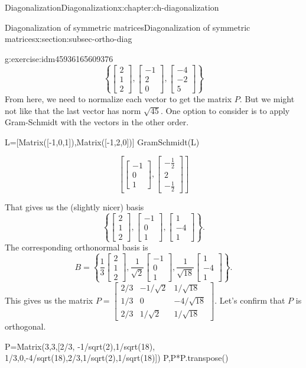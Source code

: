 \documentclass[oneside,10pt,]{book}
\numberwithin{equation}{section}
\newcommand{\bbm}{\begin{bmatrix}}
\newcommand{\ebm}{\end{bmatrix}}
\newcommand{\amp}{&}
\begin{document}
\begin{chapterptx}{Diagonalization}{}{Diagonalization}{}{}{x:chapter:ch-diagonalization}
\begin{sectionptx}{Diagonalization of symmetric matrices}{}{Diagonalization of symmetric matrices}{}{}{x:section:subsec-ortho-diag}
\begin{inlineexercise}{}{g:exercise:idm45936165609376}
\begin{equation*}
\left\{\bbm 2\\1\\2\ebm, \bbm -1\\2\\0\ebm, \bbm -4\\-2\\5\ebm\right\}
\end{equation*}
From here, we need to normalize each vector to get the matrix \(P\). But we might not like that the last vector has norm \(\sqrt{45}\). One option to consider is to apply Gram-Schmidt with the vectors in the other order.%
\begin{sageinput}
L=[Matrix([-1,0,1]),Matrix([-1,2,0])]
GramSchmidt(L)
\end{sageinput}
\begin{sageoutput}
\[\left[\bbm -1\\0\\1\ebm, \bbm -\frac12\\2\\-\frac12\ebm\right]\]
\end{sageoutput}
That gives us the (slightly nicer) basis%
\begin{equation*}
\left\{\bbm 2\\1\\2\ebm, \bbm -1\\0\\1\ebm, \bbm 1\\-4\\1\ebm\right\}\text{.}
\end{equation*}
The corresponding orthonormal basis is%
\begin{equation*}
B = \left\{\frac{1}{3}\bbm 2\\1\\2\ebm, \frac{1}{\sqrt{2}}\bbm -1\\0\\1\ebm, \frac{1}{\sqrt{18}}\bbm 1\\-4\\1\ebm\right\}\text{.}
\end{equation*}
This gives us the matrix \(P=\bbm 2/3\amp -1/\sqrt{2}\amp 1/\sqrt{18}\\1/3\amp 0 \amp -4/\sqrt{18}\\2/3\amp 1/\sqrt{2}\amp 1/\sqrt{18}\ebm\). Let's confirm that \(P\) is orthogonal.%
\begin{sageinput}
P=Matrix(3,3,[2/3, -1/sqrt(2),1/sqrt(18), 1/3,0,-4/sqrt(18),2/3,1/sqrt(2),1/sqrt(18)])
P,P*P.transpose()
\end{sageinput}

\end{inlineexercise}
\end{sectionptx}
\end{chapterptx}
\end{document}
